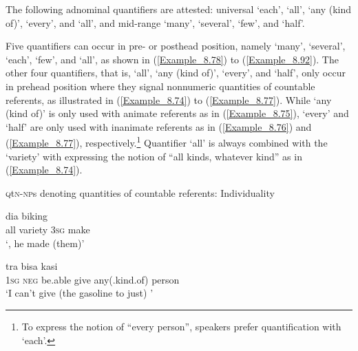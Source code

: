 The following adnominal quantifiers are attested: universal  ‘each’,  ‘all’,  ‘any (kind of)’,  ‘every’, and  ‘all’, and mid-range  ‘many’,  ‘several’,  ‘few’, and  ‘half’.



Five quantifiers can occur in pre- or posthead position, namely  ‘many’,  ‘several’,  ‘each’,  ‘few’, and  ‘all’, as shown in (\ref{Example_8.78}) to (\ref{Example_8.92}). The other four quantifiers, that is,  ‘all’,  ‘any (kind of)’,  ‘every’, and  ‘half’, only occur in prehead position where they signal nonnumeric quantities of countable referents, as illustrated in (\ref{Example_8.74}) to (\ref{Example_8.77}). While  ‘any (kind of)’ is only used with animate referents as in (\ref{Example_8.75}),  ‘every’ and  ‘half’ are only used with inanimate referents as in (\ref{Example_8.76}) and (\ref{Example_8.77}), respectively.\footnote{To express the notion of ``every person'', speakers prefer quantification with  ‘each’.} Quantifier  ‘all’ is always combined with the   ‘variety’ with  expressing the notion of ``all kinds, whatever kind'' as in (\ref{Example_8.74}).



\begin{styleExampleTitle}
\textsc{q}t\textsc{n-np}s denoting  quantities of countable referents: Individuality
\end{styleExampleTitle}
\ea
\label{Example_8.74}
 {} {dia} {biking}\\ %
 all  variety  \textsc{3sg}  make\\
 ‘, he made (them)’ \textstyleExampleSource{[080922-010a-CvNF.0297]}
\z

\ea
\label{Example_8.75}
 {tra} {bisa} {kasi} {} {}\\ %
 \textsc{1sg}  \textsc{neg}  be.able  give  any(.kind.of)  person\\
\glt 
‘I can’t give (the gasoline to just) ’ \textstyleExampleSource{[081110-002-Cv.0080]}
\z


